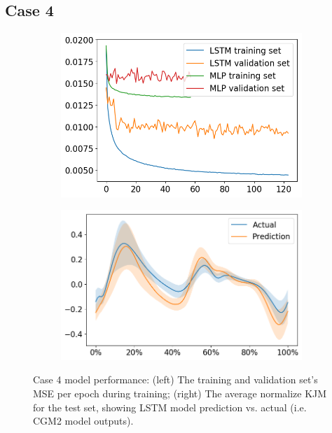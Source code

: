 \documentclass[../main.tex]{subfiles}
\begin{document}
\subsection{Case 4}
\label{sec:results-case4}

\begin{figure}[ht!]
     \centering
     \begin{subfigure}[b]{0.466\textwidth}
         \centering
         \includegraphics[width=\textwidth]{img/results/training_history/Case4_LSTMvsMLP_training.png}
     \end{subfigure}
     \hfill
     \begin{subfigure}[b]{0.524\textwidth}
         \centering
         \includegraphics[width=\textwidth]{img/results/test_prediction_evaluation/Case4_LSTM_test_prediction.png}
     \end{subfigure}
    \caption{Case 4 model performance: (left) The training and validation set's \ac{MSE} per epoch during training; (right) The average normalize \ac{KJM} for the test set, showing \ac{LSTM} model prediction vs. actual (i.e. CGM2 model outputs).}
    \label{fig:case4-performance-plots}
\end{figure}
\end{document}
